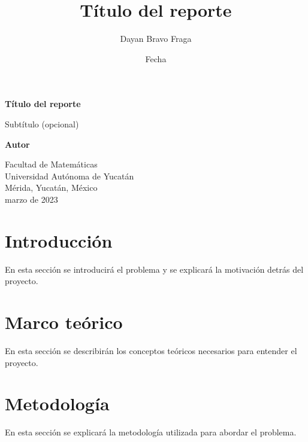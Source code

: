 \documentclass[12pt]{article}
\title{Título del reporte}
\author{Dayan Bravo Fraga}
\date{Fecha}
\begin{document}
    \begin{titlepage}
        \begin{center}
            \vspace*{1cm}

            \textbf{\LARGE Título del reporte}

            \vspace{0.5cm}
            Subtítulo (opcional)

            \vspace{1.5cm}

            \textbf{Autor}

            \vfill

            \vspace{0.8cm}


            Facultad de Matemáticas\\
            Universidad Autónoma de Yucatán\\
            Mérida, Yucatán, México\\
            marzo de 2023

        \end{center}
    \end{titlepage}

    \tableofcontents



    \section{Introducción}
    En esta sección se introducirá el problema y se explicará la motivación detrás del proyecto.



    \section{Marco teórico}
    En esta sección se describirán los conceptos teóricos necesarios para entender el proyecto.



    \section{Metodología}
    En esta sección se explicará la metodología utilizada para abordar el problema.
\end{document}
